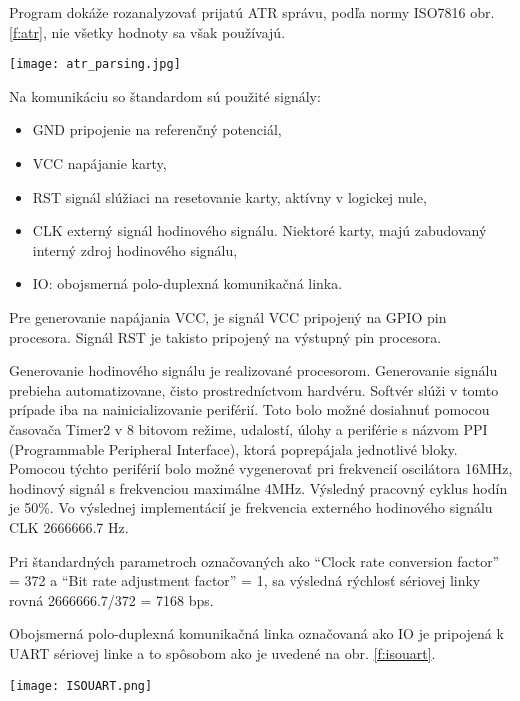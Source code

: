 \documentclass[12pt,a4wide,oneside,openright]{report}
\newcommand{\quotes}[1]{``#1''}
\begin{document}
	Program dokáže rozanalyzovať prijatú ATR správu, podľa normy ISO7816 obr. \ref{f:atr}, nie všetky hodnoty sa však používajú.

	\begin{figure*}[h]
		\centering
		\texttt{[image: atr\_parsing.jpg]}
		\caption{Analyzovanie ATR (Answer to reset) správy po pripojení smart karty\cite{smartcard}.}
		\label{f:atr}
	\end{figure*}

	Na komunikáciu so štandardom sú použité signály:
		\singlespacing
	\begin{itemize}
		\item GND pripojenie na referenčný potenciál,
		\item VCC napájanie karty,
		\item RST signál slúžiaci na resetovanie karty, aktívny v logickej nule,
		\item CLK externý signál hodinového signálu. Niektoré karty, majú zabudovaný interný zdroj hodinového signálu,
		\item IO: obojsmerná polo-duplexná komunikačná linka.
	\end{itemize}
	\onehalfspacing
	
	Pre generovanie napájania VCC, je signál VCC pripojený na GPIO pin procesora.
	Signál RST je takisto pripojený na výstupný pin procesora.
	
	Generovanie hodinového signálu je realizované procesorom. Generovanie signálu prebieha automatizovane, čisto prostredníctvom hardvéru. Softvér slúži v tomto prípade iba na nainicializovanie periférií. Toto bolo možné dosiahnuť pomocou časovača Timer2 v 8 bitovom režime, udalostí, úlohy a periférie s názvom PPI (Programmable Peripheral Interface), ktorá poprepájala jednotlivé bloky. Pomocou týchto periférií bolo možné vygenerovať pri frekvencií oscilátora 16MHz, hodinový signál s frekvenciou maximálne 4MHz. Výsledný pracovný cyklus hodín je 50\%. Vo výslednej implementácií je frekvencia externého hodinového signálu CLK 2666666.7 Hz.

	Pri štandardných parametroch označovaných ako \quotes{Clock rate conversion factor} = 372 a \quotes{Bit rate adjustment factor} = 1, sa výsledná rýchlosť sériovej linky rovná 2666666.7/372 = 7168 bps.

	Obojsmerná polo-duplexná komunikačná linka označovaná ako IO je pripojená k UART sériovej linke a to spôsobom ako je uvedené na obr. \ref{f:isouart}.

	\begin{figure*}[h]
		\centering
		\texttt{[image: ISOUART.png]}
		\caption{Pripojenie pinov RX a TX (UART) k pinu I/O (ISO7816).}
		\label{f:isouart}
	\end{figure*}
\end{document}
